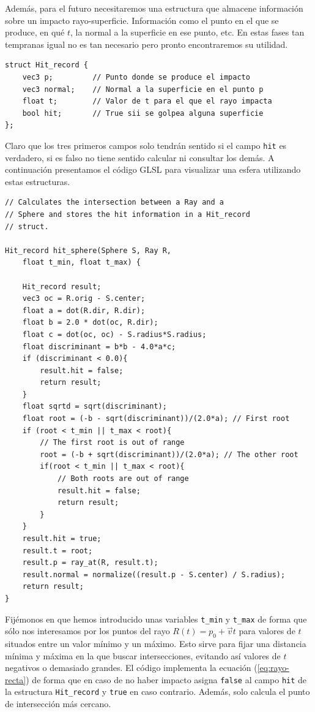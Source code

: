 Además, para el futuro necesitaremos una estructura que almacene información sobre un impacto rayo-superficie. Información como el punto en el que se produce, en qué $t$, la normal a la superficie en ese punto, etc. En estas fases tan tempranas igual no es tan necesario pero pronto encontraremos su utilidad.

\begin{lstlisting}
struct Hit_record {
    vec3 p;         // Punto donde se produce el impacto
    vec3 normal;    // Normal a la superficie en el punto p
    float t;        // Valor de t para el que el rayo impacta
    bool hit;       // True sii se golpea alguna superficie
};
\end{lstlisting}

Claro que los tres primeros campos solo tendrán sentido si el campo \verb|hit| es verdadero, si es falso no tiene sentido calcular ni consultar los demás. A continuación presentamos el código GLSL para visualizar una esfera utilizando estas estructuras.

\begin{lstlisting}
// Calculates the intersection between a Ray and a 
// Sphere and stores the hit information in a Hit_record 
// struct.

Hit_record hit_sphere(Sphere S, Ray R, 
    float t_min, float t_max) {

    Hit_record result;
    vec3 oc = R.orig - S.center;
    float a = dot(R.dir, R.dir);
    float b = 2.0 * dot(oc, R.dir);
    float c = dot(oc, oc) - S.radius*S.radius;
    float discriminant = b*b - 4.0*a*c;
    if (discriminant < 0.0){
        result.hit = false;
        return result;
    }
    float sqrtd = sqrt(discriminant);
    float root = (-b - sqrt(discriminant))/(2.0*a); // First root
    if (root < t_min || t_max < root){ 
        // The first root is out of range
        root = (-b + sqrt(discriminant))/(2.0*a); // The other root
        if(root < t_min || t_max < root){ 
            // Both roots are out of range
            result.hit = false;
            return result;
        }
    } 
    result.hit = true;
    result.t = root;
    result.p = ray_at(R, result.t);
    result.normal = normalize((result.p - S.center) / S.radius);
    return result;
}
\end{lstlisting}

Fijémonos en que hemos introducido unas variables \verb|t_min| y \verb|t_max| de forma que sólo nos interesamos por los puntos del rayo $R(t)=p_0+\vec vt$ para valores de $t$ situados entre un valor mínimo y un máximo. Esto sirve para fijar una distancia mínima y máxima en la que buscar intersecciones, evitando así valores de $t$ negativos o demasiado grandes. El código implementa la ecuación (\ref{eq:rayo-recta}) de forma que en caso de no haber impacto asigna \verb|false| al campo \verb|hit| de la estructura \verb|Hit_record| y \verb|true| en caso contrario. Además, solo calcula el punto de intersección más cercano.

